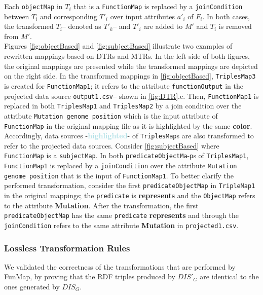 Each \verb|objectMap| in $T_i$ that is a \verb|FunctionMap| is replaced by a \verb|joinCondition| between $T_i$ and corresponding $T'_i$ over input attributes $a'_i$ of $F_i$. 
In both cases, the transformed $T_i$-- denoted as $T'_k$-- and $T'_i$ are added to $M'$ and $T_i$ is removed from $M'$. \\     
Figures \ref{fig:objectBased} and \ref{fig:subjectBased} illustrate two examples of rewritten mappings based on DTRs and MTRs. In the left side of both figures, the original mappings are presented while the transformed mappings are depicted on the right side. In the transformed mappings in \autoref{fig:objectBased}, \verb|TriplesMap3| is created for \verb|FunctionMap1|; it refers to the attribute \verb|functionOutput| in the projected data source \verb|output1.csv|-- shown in \autoref{fig:DTR}.c. Then, \verb|FunctionMap1| is replaced in both \verb|TriplesMap1| and \verb|TriplesMap2| by a join condition over the attribute \verb|Mutation genome position| which is the input attribute of \verb|FunctionMap| in the original mapping file as it is highlighted by the same \textcolor{metallicSeaweed}{\textbf{color}}. Accordingly, data sources -\textcolor{powderBlue}{\textbf{highlighted}}- of \verb|TriplesMap|s are also transformed to refer to the projected data sources. 
Consider \autoref{fig:subjectBased} where \verb|FunctionMap| is a \verb|subjectMap|. In both \verb|predicateObjectMa|-\verb|p|s of \verb|TriplesMap1|, \verb|FunctionMap1| is replaced by a \verb|joinCondition| over the attribute \verb|Mutation genome position| that is the input of \verb|FunctionMap1|. To better clarify the performed transformation, consider the first \verb|predicateObjectMap| in \verb|TripleMap1| in the original mappings; the \verb|predicate| is \textcolor{burntSienna}{\textbf{represents}} and the \verb|ObjectMap| refers to the attribute \textcolor{metallicSeaweed}{\textbf{Mutation}}. After the transformation, the first \verb|predicateObjectMap| has the same \verb|predicate| \textcolor{burntSienna}{\textbf{represents}} and through the \verb|joinCondition| refers to the same attribute \textcolor{metallicSeaweed}{\textbf{Mutation}} in \verb|projected1.csv|. 

\subsubsection{Lossless Transformation Rules}
\label{subsec:formalEval}
We validated the correctness of the transformations that are performed by FunMap, by proving that the RDF triples produced by $DIS'_G$ are identical to the ones generated by $DIS_G$.

